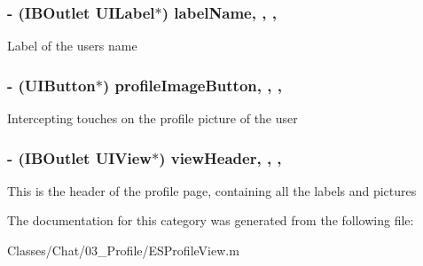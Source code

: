 \subsubsection[{label\+Name}]{\setlength{\rightskip}{0pt plus 5cm}-\/ (I\+B\+Outlet U\+I\+Label$\ast$) label\+Name\hspace{0.3cm}{\ttfamily [read]}, {\ttfamily [write]}, {\ttfamily [nonatomic]}, {\ttfamily [strong]}}\label{category_e_s_profile_view_07_08_a16688abf50759074dad3e4cff22a3bea}
Label of the user\textquotesingle{}s name \hypertarget{category_e_s_profile_view_07_08_a84e00981667dd253f902ca17d76443db}{}
\subsubsection[{profile\+Image\+Button}]{\setlength{\rightskip}{0pt plus 5cm}-\/ (U\+I\+Button$\ast$) profile\+Image\+Button\hspace{0.3cm}{\ttfamily [read]}, {\ttfamily [write]}, {\ttfamily [nonatomic]}, {\ttfamily [strong]}}\label{category_e_s_profile_view_07_08_a84e00981667dd253f902ca17d76443db}
Intercepting touches on the profile picture of the user \hypertarget{category_e_s_profile_view_07_08_a7f9431f802b522499bab2a8b4b90f298}{}
\subsubsection[{view\+Header}]{\setlength{\rightskip}{0pt plus 5cm}-\/ (I\+B\+Outlet U\+I\+View$\ast$) view\+Header\hspace{0.3cm}{\ttfamily [read]}, {\ttfamily [write]}, {\ttfamily [nonatomic]}, {\ttfamily [strong]}}\label{category_e_s_profile_view_07_08_a7f9431f802b522499bab2a8b4b90f298}
This is the header of the profile page, containing all the labels and pictures 

The documentation for this category was generated from the following file\+:\begin{DoxyCompactItemize}
\item 
Classes/\+Chat/03\+\_\+\+Profile/E\+S\+Profile\+View.\+m\end{DoxyCompactItemize}
